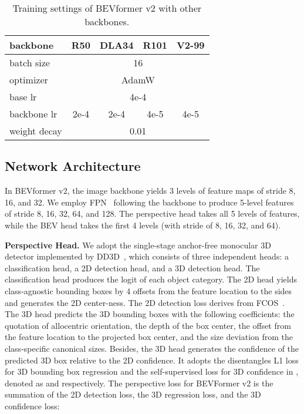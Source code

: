 \documentclass[10pt,twocolumn,letterpaper]{article}
\begin{document}
\let\ck\checkmark

\setlength{\tabcolsep}{5pt}
\setlength{\doublerulesep}{2\arrayrulewidth}
\renewcommand{\arraystretch}{1.0}
\begin{table}[ht]
    \caption{Training settings of BEVformer v2 with other backbones.}
    \label{table:training_setting_other}
    \centering
    \begin{tabular}{l|cccc}
backbone & R50 & DLA34 & R101 & V2-99 \\
        \hline
        batch size & \multicolumn{4}{c}{16} \\
        optimizer & \multicolumn{4}{c}{AdamW} \\
        base lr & \multicolumn{4}{c}{4e-4} \\
        backbone lr & 2e-4 & 2e-4 & 4e-5 & 4e-5 \\
        weight decay & \multicolumn{4}{c}{0.01} \\
        \hline
    \end{tabular}
    
\end{table} 
\subsection{Network Architecture}
In BEVformer v2, the image backbone yields 3 levels of feature maps of stride 8, 16, and 32. We employ FPN~\cite{FPN} following the backbone to produce 5-level features of stride 8, 16, 32, 64, and 128. The perspective head takes all 5 levels of features, while the BEV head takes the first 4 levels (with stride of 8, 16, 32, and 64).

\noindent\textbf{Perspective Head.} We adopt the single-stage anchor-free monocular 3D detector implemented by DD3D~\cite{DD3D}, which consists of three independent heads: a classification head, a 2D detection head, and a 3D detection head. 
The classification head produces the logit of each object category. 
The 2D head yields class-agnostic bounding boxes by 4 offsets from the feature location to the sides and generates the 2D center-ness. 
The 2D detection loss  derives from FCOS~\cite{fcos}.
The 3D head predicts the 3D bounding boxes with the following coefficients: the quotation of allocentric orientation, the depth of the box center, the offset from the feature location to the projected box center, and the size deviation from the class-specific canonical sizes. 
Besides, the 3D head generates the confidence of the predicted 3D box relative to the 2D confidence.
It adopts the disentangles L1 loss for 3D bounding box regression and the self-supervised loss for 3D confidence in \cite{MonoDIS}, denoted as  and  respectively. 
The perspective loss for BEVFormer v2 is the summation of the 2D detection loss, the 3D regression loss, and the 3D confidence loss:
\end{document}
